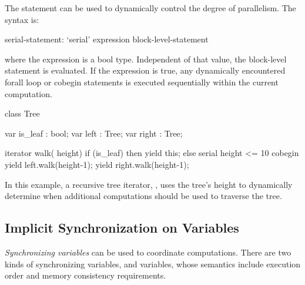 The  statement can be used to dynamically control the
degree of parallelism.  The syntax is:
\begin{syntax}
serial-statement:
  `serial' expression block-level-statement
\end{syntax}
where the expression is a bool type.  Independent of that value, the
block-level statement is evaluated. If the expression is true, any
dynamically encountered forall loop or cobegin statements is executed
sequentially within the current computation.


\begin{example}
\begin{chapel}      
class Tree {
  var is_leaf : bool;
  var left    : Tree;
  var right   : Tree;

 iterator walk( height) {
  if (is_leaf) then
    yield this;
  else
    serial height <= 10 cobegin {
      yield left.walk(height-1);
      yield right.walk(height-1);
    }
 }
}
\end{chapel}
In this example, a recursive tree iterator, , uses the
tree's height to dynamically determine when additional computations
should be used to traverse the tree.
\end{example}






\subsection{Implicit Synchronization on Variables}
\label{Implicit_Synchronization_on_Variables}

{\em Synchronizing variables} can be used to coordinate computations.
There are two kinds of synchronizing variables, 
and  variables, whose semantics include execution order and
memory consistency requirements.

